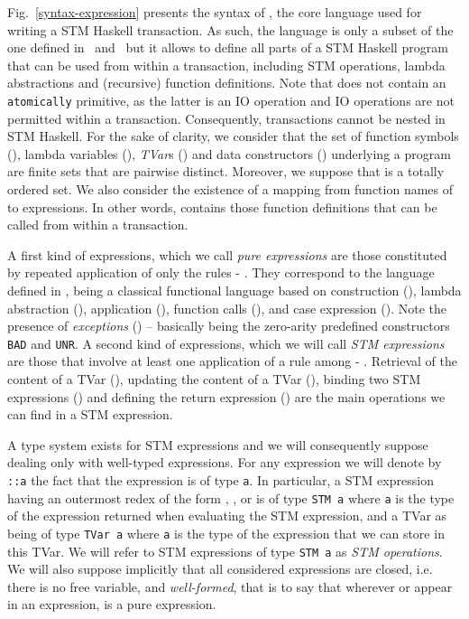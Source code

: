 \documentclass[submission,copyright,creativecommons]{eptcs}
\begin{document}
Fig.~\ref{syntax-expression} presents the syntax of , the core language used for writing a STM Haskell transaction. As such, the language is only a subset of the one defined in~\cite{composable-memory-transactions} and~\cite{compositional-theory-stm} but it allows to define all parts of a STM Haskell program that can be used from within a transaction, including STM operations, lambda abstractions and (recursive) function definitions. Note that  does not contain an \texttt{atomically} primitive, as the latter is an IO operation and IO operations are not permitted within a transaction. Consequently, transactions cannot be nested in STM Haskell.
For the sake of clarity, we consider that the set of function symbols (), lambda variables (), \emph{TVar}s () and data constructors () underlying a program are finite sets that are pairwise distinct. 
Moreover, we suppose that  is a totally ordered set. We also consider the existence of a mapping  from function names of  to expressions. In other words,  contains those function definitions that can be called from within a transaction.



\begin{figure*}[htb]
  \centering
\caption{Syntax of  expressions}
\label{syntax-expression}
\end{figure*}


A first kind of expressions, which we call \emph{pure expressions} are those constituted by repeated application of only the rules  - . They correspond to the language defined in \cite{static-contract-checking}, being a classical functional language based on construction (), lambda abstraction (), application (), function calls (), and case expression (). Note the presence of \emph{exceptions} () -- basically being the zero-arity predefined constructors \texttt{BAD} and \texttt{UNR}.
A second kind of expressions, which we will call \emph{STM expressions} are those that involve at least one application of a rule among  - . 
Retrieval of the content of a TVar (), updating the content of a TVar (), binding two STM expressions () and defining the return expression () are the main operations we can find in a STM expression. 



A type system exists for 
STM expressions \cite{compositional-theory-stm} and we will consequently suppose dealing only with well-typed expressions. 
For any expression  we will denote by \texttt{::a} the fact that the expression is of type \texttt{a}. 
In particular, a STM expression having an outermost redex of the form , ,  or  is of type \texttt{STM a} where \texttt{a} is the type of the expression returned when evaluating the STM expression, and a TVar as being of type \texttt{TVar a} where \texttt{a} is the type of the expression that we can store in this TVar. We will refer to STM expressions of type \texttt{STM a} as \emph{STM operations}. 
We will also suppose implicitly that all considered expressions are closed, i.e. there is no free variable, and \emph{well-formed}, that is to say that wherever  or  appear in an expression,  is a pure expression.
\end{document}

